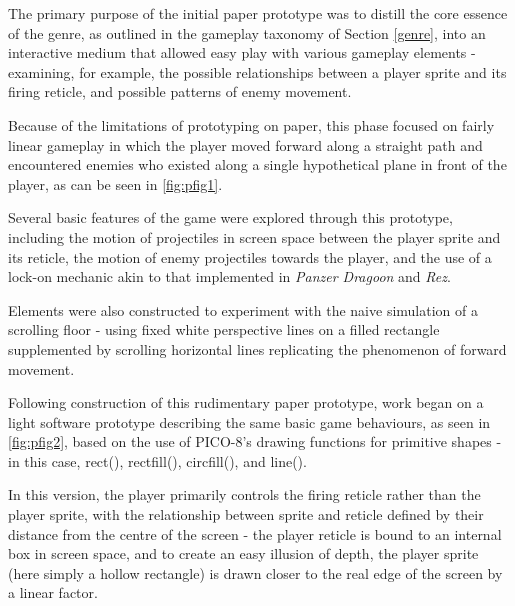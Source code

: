 \documentclass[11pt]{article}
\begin{document}

The primary purpose of the initial paper prototype was to distill the core essence of the
genre, as outlined in the gameplay taxonomy of Section \ref{genre}, into an interactive
medium that allowed easy play with various gameplay elements - examining, for example,
the possible relationships between a player sprite and its firing reticle, and possible
patterns of enemy movement.

Because of the limitations of prototyping on paper, this
phase focused on fairly linear gameplay in which the player moved forward along a straight
path and encountered enemies who existed along a single hypothetical plane in front of
the player, as can be seen in \ref{fig:pfig1}.

Several basic features of the game were explored through this prototype, including the
motion of projectiles in screen space between the player sprite and its reticle, the
motion of enemy projectiles towards the player, and the use of a lock-on mechanic akin to
that implemented in \textit{Panzer Dragoon} and \textit{Rez}.

Elements were also constructed to experiment with the naive simulation of a scrolling
floor - using fixed white perspective lines on a filled rectangle supplemented by
scrolling horizontal lines replicating the phenomenon of forward movement.

Following construction of this rudimentary paper prototype, work began on a light software
prototype describing the same basic game behaviours, as seen in \ref{fig:pfig2}, based on the
use of PICO-8's drawing functions for primitive shapes - in this case, rect(), rectfill(),
circfill(), and line().

In this version, the player primarily controls the firing reticle rather than the player sprite,
with the relationship between sprite and reticle defined by their distance from the centre of the
screen - the player reticle is bound to an internal box in screen space, and to create an easy
illusion of depth, the player sprite (here simply a hollow rectangle) is drawn closer to the
real edge of the screen by a linear factor.
\end{document}
